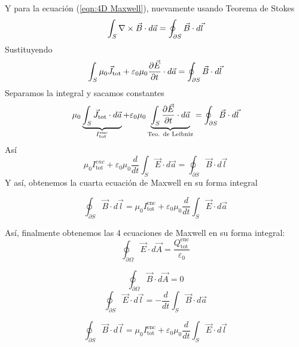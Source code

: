 \documentclass{electro}
\begin{document}
    Y para la ecuación (\ref{eqn:4D Maxwell}), nuevamente usando Teorema de Stokes
    \[\int_S \nabla \times{\vec{B}} \cdot d\vec{a} = \oint_{\partial S} \vec{B} \cdot d\vec{l}\]
    Sustituyendo
    \[\int_S \mu_0 \vec{J}_{\text{tot}}+\varepsilon_0 \mu_0 \frac{\partial \vec{E}}{\partial t} \cdot d\vec{a}=\oint_{\partial S} \vec{B} \cdot d\vec{l} \]
    Separamos la integral y sacamos constantes
    \[\mu_0\underbrace{\int_S\vec{J}_{\text{tot}} \cdot d\vec{a}}_{I_{\text{tot}}^{\text{enc}}} + \varepsilon_0 \mu_0 \underbrace{\int_{S}\frac{\partial \vec{E}}{\partial t} \cdot d\vec{a}}_{\text{Teo. de Leibniz}} = \oint_{\partial S} \vec{B} \cdot d\vec{l}\]
    Así
    \[\mu_0 I_{\text{tot}}^{enc}+\varepsilon_0 \mu_0 \frac{d}{dt} \int_{S} \vec{E} \cdot d\vec{a}=\oint_{\partial S} \vec{B} \cdot d\vec{l}\]
    Y así, obtenemos la cuarta ecuación de Maxwell en su forma integral
    \begin{tcolorbox}[colframe=white, colback=secdos!40, arc=8pt, left=2mm, right=2mm, top=2mm, bottom=2mm]
    \begin{equation}
        \oint_{\partial S} \vec{B} \cdot d\vec{l}=\mu_0 I_{\text{tot}}^{\text{enc}}+\varepsilon_0 \mu_0 \frac{d}{dt}\int_S \vec{E}\cdot d\vec{a} 
        \tag{Ampère-Maxwell}
    \end{equation}
    \end{tcolorbox}
    
    Así, finalmente obtenemos las 4 ecuaciones de Maxwell en su forma integral:
    \begin{equation}
        \oint_{\partial \Omega} \vec{E} \cdot d\vec{A} = \frac{Q_{\text{tot}}^{\text{enc}}}{\varepsilon_0}
        \label{eqn:1I Maxwell}
    \end{equation}

    \begin{equation}
        \oint_{\partial \Omega} \vec{B} \cdot d\vec{A} = 0
        \label{eqn:2I Maxwell}
    \end{equation}
    \begin{equation}
        \oint_{\partial S} \vec{E} \cdot d\vec{l}=-\frac{d}{dt}\int_S \vec{B} \cdot d\vec{a}
        \label{eqn:3I Maxwell}
    \end{equation}

    \begin{equation}
        \oint_{\partial S} \vec{B} \cdot d\vec{l}=\mu_0 I_{\text{tot}}^{\text{enc}}+\varepsilon_0 \mu_0 \frac{d}{dt}\int_S \vec{E}\cdot d\vec{l}
        \label{eqn:4I Maxwell}
    \end{equation}
    
\end{document}
